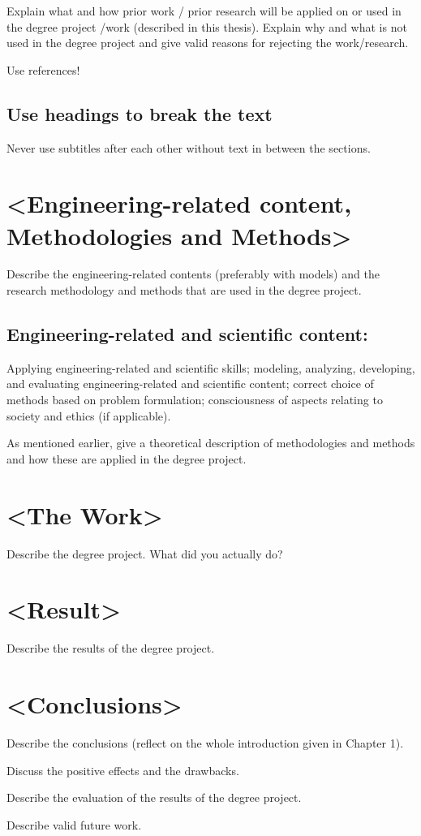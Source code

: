 Explain what and how prior work / prior research will be applied on or used in the degree project /work (described in this thesis). Explain why and what is not used in the degree project and give valid reasons for rejecting the work/research.

Use references!

\subsection{Use headings to break the text}
Never use subtitles after each other without text in between the sections.

\newpage
\section{<Engineering-related content, Methodologies and Methods>}
Describe the engineering-related contents (preferably with models) and the research methodology and methods that are used in the degree project. 

\subsection{Engineering-related and scientific content:}
Applying engineering-related and scientific skills; modeling, analyzing, developing, and evaluating engineering-related and scientific content; correct choice of methods based on problem formulation; consciousness of aspects relating to society and ethics (if applicable).

As mentioned earlier, give a theoretical description of methodologies and methods and how these are applied in the degree project.

\newpage
\section{<The Work> }
Describe the degree project. What did you actually do?

\newpage
\section{<Result> }
Describe the results of the degree project.

\newpage
\section{<Conclusions> }
Describe the conclusions (reflect on the whole introduction given in Chapter 1). 

Discuss the positive effects and the drawbacks. 

Describe the evaluation of the results of the degree project.

Describe valid future work.  










